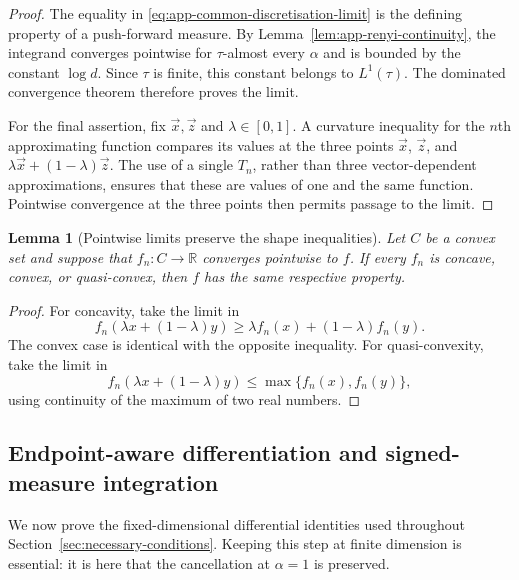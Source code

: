 \documentclass[aps,pra,11pt,onecolumn,nofootinbib,tightenlines]{revtex4-2}
\newtheorem{lemma}[theorem]{Lemma}
\theoremstyle{definition}
\begin{document}
\begin{proof}
The equality in \eqref{eq:app-common-discretisation-limit} is the defining property of a push-forward measure.  By Lemma~\ref{lem:app-renyi-continuity}, the integrand converges pointwise for $\tau$-almost every $\alpha$ and is bounded by the constant $\log d$.  Since $\tau$ is finite, this constant belongs to $L^1(\tau)$.  The dominated convergence theorem therefore proves the limit.

For the final assertion, fix $\vec x,\vec z$ and $\lambda\in[0,1]$.  A curvature inequality for the $n$th approximating function compares its values at the three points $\vec x$, $\vec z$, and $\lambda\vec x+(1-\lambda)\vec z$.  The use of a single $T_n$, rather than three vector-dependent approximations, ensures that these are values of one and the same function.  Pointwise convergence at the three points then permits passage to the limit.
\end{proof}

\begin{lemma}[Pointwise limits preserve the shape inequalities]
\label{lem:app-pointwise-shape}
Let $C$ be a convex set and suppose that $f_n:C\to\mathbb R$ converges pointwise to $f$.  If every $f_n$ is concave, convex, or quasi-convex, then $f$ has the same respective property.
\end{lemma}

\begin{proof}
For concavity, take the limit in
\begin{equation}
 f_n(\lambda x+(1-\lambda)y)
 \geq\lambda f_n(x)+(1-\lambda)f_n(y).
 \label{eq:app-limit-concavity}
\end{equation}
The convex case is identical with the opposite inequality.  For quasi-convexity, take the limit in
\begin{equation}
 f_n(\lambda x+(1-\lambda)y)
 \leq\max\{f_n(x),f_n(y)\},
 \label{eq:app-limit-quasiconvexity}
\end{equation}
using continuity of the maximum of two real numbers.
\end{proof}

\subsection{Endpoint-aware differentiation and signed-measure integration}
\label{app:fixed-d-calculus}

We now prove the fixed-dimensional differential identities used throughout Section~\ref{sec:necessary-conditions}. Keeping this step at finite dimension is essential: it is here that the cancellation at $\alpha=1$ is preserved.
\end{document}
